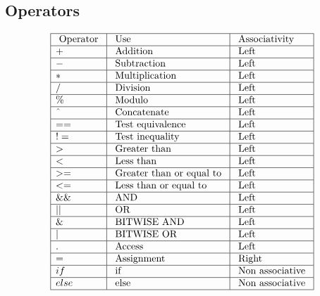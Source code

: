 \documentclass[english,a4paper,12pt]{report}
\begin{document}
\subsection{Operators}
$$
\begin{array}{|l|l|l|}
\hline \text { Operator } & \text { Use } & \text { Associativity } \\
\hline + & \text { Addition } & \text { Left } \\
\hline - & \text { Subtraction } & \text { Left } \\
\hline * & \text { Multiplication } & \text { Left } \\
\hline / & \text { Division } & \text { Left } \\
\hline \% & \text { Modulo } & \text { Left } \\
\hline \textasciicircum & \text { Concatenate } & \text { Left } \\
\hline== & \text { Test equivalence } & \text { Left } \\
\hline != & \text { Test inequality } & \text { Left } \\
\hline> & \text { Greater than } & \text { Left } \\
\hline< & \text { Less than } & \text { Left } \\
\hline>= & \text { Greater than or equal to } & \text { Left } \\
\hline<= & \text { Less than or equal to } & \text { Left} \\
\hline \&\& & \text { AND } & \text { Left } \\
\hline \mid\mid & \text { OR } & \text { Left } \\
\hline \&  & \text { BITWISE AND } & \text { Left } \\
\hline | & \text { BITWISE OR } & \text { Left } \\
\hline . & \text { Access } & \text { Left } \\
\hline= & \text { Assignment } & \text { Right } \\
\hline if & \text { if } & \text { Non associative } \\
\hline else & \text { else } & \text { Non associative } \\
\hline
\end{array}
$$
\end{document}

